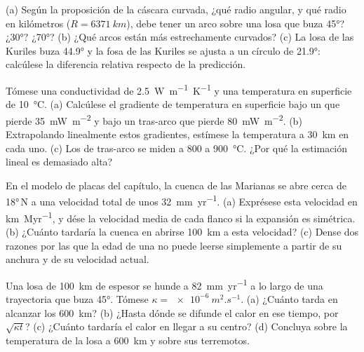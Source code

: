 \begin{exercise}[$\star\star$]\label{exo:b1:active-margins:7}
(a) Según la proposición de la cáscara curvada, ¿qué radio angular, y qué radio en kilómetros ($R = \qty{6371}{km}$), debe tener un arco sobre una
losa que buza \ang{45}? ¿\ang{30}? ¿\ang{70}? (b) ¿Qué arcos están más estrechamente curvados? (c) La losa de las Kuriles buza \ang{44.9} y la fosa de
las Kuriles se ajusta a un círculo de \ang{21.9}: calcúlese la diferencia relativa respecto de la predicción.
\end{exercise}

\begin{exercise}[$\star\star$]\label{exo:b1:active-margins:8}
Tómese una conductividad de \qty{2.5}{W.m^{-1}.K^{-1}} y una temperatura en superficie de \qty{10}{\celsius}. (a) Calcúlese el gradiente de temperatura en
superficie bajo un  que pierde \qty{35}{mW.m^{-2}} y bajo un tras-arco que pierde \qty{80}{mW.m^{-2}}. (b) Extrapolando linealmente estos gradientes,
estímese la temperatura a \qty{30}{km} en cada uno. (c) Los  de tras-arco se miden a 800 a \qty{900}{\celsius}. ¿Por qué la estimación lineal es demasiado alta?
\end{exercise}

\begin{exercise}[$\star\star$]\label{exo:b1:active-margins:9}
En el modelo de placas del capítulo, la cuenca de las Marianas se abre cerca de \ang{18}\,N a una velocidad total de unos \qty{32}{mm.yr^{-1}}. (a) Exprésese esta
velocidad en \unit{km.Myr^{-1}}, y dése la velocidad media de cada flanco si la expansión es simétrica. (b) ¿Cuánto tardaría la cuenca en abrirse \qty{100}{km}
a esta velocidad? (c) Dense dos razones por las que la edad de una  no puede leerse simplemente a partir de su anchura y de su velocidad actual.
\end{exercise}

\begin{exercise}[$\star\star\star$]\label{exo:b1:active-margins:10}
Una losa de \qty{100}{km} de espesor se hunde a \qty{82}{mm.yr^{-1}} a lo largo de una trayectoria que buza \ang{45}. Tómese $\kappa = \qty{e-6}{m^2.s^{-1}}$. (a) ¿Cuánto tarda en alcanzar
los \qty{600}{km}? (b) ¿Hasta dónde se difunde el calor en ese tiempo, por $\sqrt{\kappa t}$? (c) ¿Cuánto tardaría el calor en llegar a su centro? (d)
Concluya sobre la temperatura de la losa a \qty{600}{km} y sobre sus terremotos.
\end{exercise}

